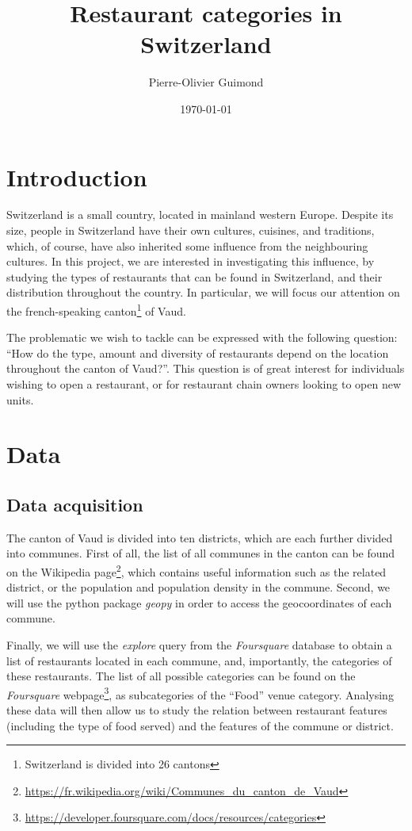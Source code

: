 \documentclass[12pt]{article}
\begin{document}
\title{Restaurant categories in Switzerland}

\author{Pierre-Olivier Guimond}

\date{\today}
\maketitle

\section{Introduction}

Switzerland is a small country, located in mainland western Europe. Despite its size, people in Switzerland have their own cultures, cuisines, and traditions, which, of course, have also inherited some influence from the neighbouring cultures. In this project, we are interested in investigating this influence, by studying the types of restaurants that can be found in Switzerland, and their distribution throughout the country. In particular, we will focus our attention on the french-speaking canton\footnote{Switzerland is divided into 26 cantons} of Vaud.

The problematic we wish to tackle can be expressed with the following question: ``How do the type, amount and diversity of restaurants depend on the location throughout the canton of Vaud?''. This question is of great interest for individuals wishing to open a restaurant, or for restaurant chain owners looking to open new units.    

\section{Data} 

\subsection{Data acquisition}

The canton of Vaud is divided into ten districts, which are each further divided into communes. First of all, the list of all communes in the canton can be found on the Wikipedia page\footnote{\url{https://fr.wikipedia.org/wiki/Communes\_du\_canton\_de\_Vaud}}, which contains useful information such as the related district, or the population and population density in the commune. Second, we will use the python package {\em geopy} in order to access the geocoordinates of each commune. 

Finally, we will use the {\em explore} query from the {\em Foursquare} database to obtain a list of restaurants located in each commune, and, importantly, the categories of these restaurants. The list of all possible categories can be found on the {\em Foursquare} webpage\footnote{\url{https://developer.foursquare.com/docs/resources/categories}}, as subcategories of the ``Food'' venue category.
Analysing these data will then allow us to study the relation between restaurant features (including the type of food served) and the features of the commune or district.
\end{document}
